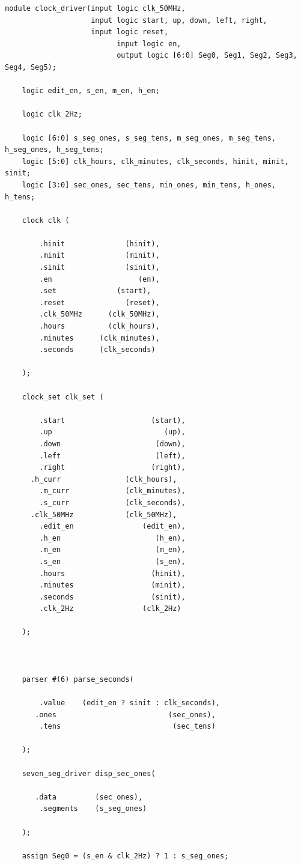 \documentclass[a4paper]{article}
\begin{document}
\begin{Verbatim}
module clock_driver(input logic clk_50MHz,
                    input logic start, up, down, left, right,
                    input logic reset,
						  input logic en,
						  output logic [6:0] Seg0, Seg1, Seg2, Seg3, Seg4, Seg5);
						
	logic edit_en, s_en, m_en, h_en;
	
	logic clk_2Hz;
	
	logic [6:0] s_seg_ones, s_seg_tens, m_seg_ones, m_seg_tens, h_seg_ones, h_seg_tens;
	logic [5:0] clk_hours, clk_minutes, clk_seconds, hinit, minit, sinit;
	logic [3:0] sec_ones, sec_tens, min_ones, min_tens, h_ones, h_tens;
	
	clock clk (
	   
		.hinit              (hinit),
		.minit              (minit),
		.sinit              (sinit),
		.en                    (en),
		.set              (start),
		.reset              (reset),
		.clk_50MHz      (clk_50MHz),
		.hours          (clk_hours),
		.minutes      (clk_minutes),
		.seconds      (clk_seconds)
	
	);
	
	clock_set clk_set (
	   
		.start                    (start),	
		.up                          (up),        
		.down                      (down),
		.left                      (left), 
		.right                    (right),
      .h_curr               (clk_hours), 
		.m_curr             (clk_minutes), 
		.s_curr             (clk_seconds),       
      .clk_50MHz            (clk_50MHz),
		.edit_en                (edit_en), 
		.h_en                      (h_en), 
		.m_en                      (m_en), 
		.s_en                      (s_en),
		.hours                    (hinit), 
		.minutes                  (minit), 
		.seconds                  (sinit),
		.clk_2Hz                (clk_2Hz)
	
	);
	
	
	
	parser #(6) parse_seconds(
	   
		.value    (edit_en ? sinit : clk_seconds),
	   .ones                          (sec_ones),
		.tens                          (sec_tens)  
	
	);
	
	seven_seg_driver disp_sec_ones(
	
	   .data         (sec_ones),
		.segments    (s_seg_ones)
	
	);
	
	assign Seg0 = (s_en & clk_2Hz) ? 1 : s_seg_ones; 
	

\end{Verbatim}
\end{document}
